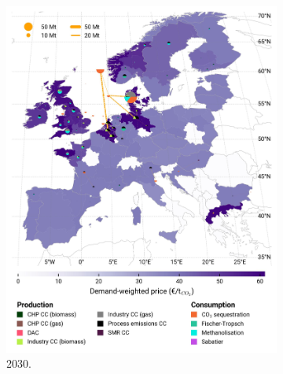 \documentclass[preprint,12pt,sort&compress]{elsarticle}
\begin{document}
\begin{figure}[htbp]
\begin{subfigure}[t]{0.4\textwidth}
      \includegraphics[width=1\textwidth,trim=0cm 3.2cm 0cm 0cm, clip]{maps/pcipmi/base_s_adm___2030-balance_map_co2_stored} 
      \vspace{-0.5cm}
      \caption{ 2030.}
      \label{fig:PCI_lt_2030_co2}
  \end{subfigure}
  \begin{subfigure}[t]{0.4\textwidth}
      \vspace{0pt}

\end{subfigure}
\end{figure}
\end{document}
